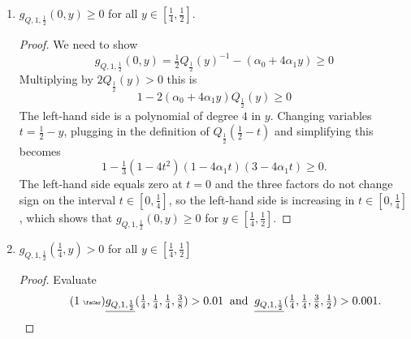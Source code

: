 \documentclass[12pt]{amsart}
\theoremstyle{plain}
\newcommand{\auto}{\tag{\addtocounter{equation}{1}\theequation\;{\tiny\faCar}}}
\theoremstyle{definition}
\theoremstyle{remark}
\numberwithin{equation}{section}
\begin{document}
\begin{enumerate}
\item $g_{Q,1,\frac12}(0,y)\ge 0$ for all $y\in[\tfrac14,\tfrac12]$.
\begin{proof}
We need to show
\[ g_{Q,1,\frac12}(0,y)=\tfrac12 Q_{\frac12}(y)^{-1} - (\alpha_0+4\alpha_1 y) \ge 0\]
Multiplying by $2Q_{\frac12}(y)>0$ this is 
\[ 1 - 2(\alpha_0+4\alpha_1 y)Q_{\frac12}(y) \ge 0 \]
The left-hand side is a polynomial of degree $4$ in $y$.
Changing variables $t=\tfrac12-y$, plugging in the definition of $Q_{\frac12}(\tfrac12-t)$ and simplifying this becomes
\[ 1-\tfrac13 (1-4t^2)(1-4\alpha_1 t)(3-4\alpha_1 t) \ge 0. \]
The left-hand side equals zero at $t=0$ and the three factors do not change sign on the interval $t\in [0,\tfrac14]$, so the left-hand side is increasing in $t\in [0,\tfrac14]$, which shows that $g_{Q,1,\frac12}(0,y)\ge 0$ for $y\in [\tfrac14, \tfrac12]$.
\end{proof}
\item $g_{Q,1,\frac12}(\tfrac14,y)>0$ for all $y\in [\tfrac14,\tfrac12]$
\begin{proof}
Evaluate
\begin{equation}\label{eqn:g_Q_1_y1_4_auto}\auto 
\underline{g_{Q,1,\frac12}}(\tfrac14,\tfrac14,\tfrac14,\tfrac38) > 0.01\;\;\text{and}\;\;
\underline{g_{Q,1,\frac12}}(\tfrac14,\tfrac14,\tfrac38,\tfrac12)> 0.001.
\end{equation}
\end{proof}
\end{enumerate}
\end{document}
